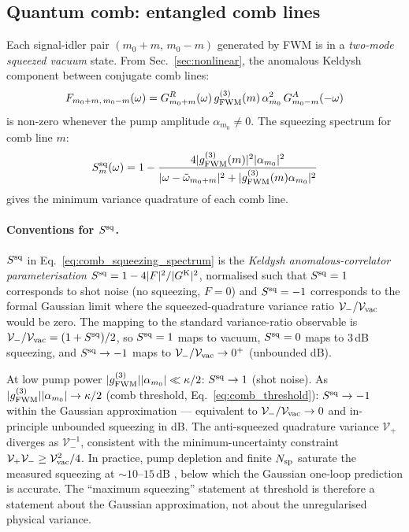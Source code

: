 \documentclass[12pt]{article}
\newcommand{\Keldysh}{{\rm K}}
\begin{document}
\subsection{Quantum comb: entangled comb lines}

Each signal-idler pair $(m_0+m,\, m_0-m)$ generated by FWM is in a
\emph{two-mode squeezed vacuum} state.  From Sec.~\ref{sec:nonlinear},
the anomalous Keldysh component between conjugate comb lines:
\begin{equation}
  F_{m_0+m,\,m_0-m}(\omega) =
  G^R_{m_0+m}(\omega)\,g^{(3)}_{\rm FWM}(m)\,\alpha_{m_0}^2\,
  G^A_{m_0-m}(-\omega)
  \label{eq:comb_squeezing}
\end{equation}
is non-zero whenever the pump amplitude $\alpha_{m_0}\neq 0$.  The
squeezing spectrum for comb line $m$:
\begin{equation}
  S^{\rm sq}_{m}(\omega) = 1 -
  \frac{4|g^{(3)}_{\rm FWM}(m)|^2|\alpha_{m_0}|^2}
  {|\omega - \tilde{\omega}_{m_0+m}|^2 + |g^{(3)}_{\rm FWM}(m)\alpha_{m_0}|^2}
  \label{eq:comb_squeezing_spectrum}
\end{equation}
gives the minimum variance quadrature of each comb line.
\paragraph{Conventions for $S^{\rm sq}$.}
$S^{\rm sq}$ in Eq.~\eqref{eq:comb_squeezing_spectrum} is the
\emph{Keldysh anomalous-correlator parameterisation}
$S^{\rm sq}=1-4|F|^2/|G^\Keldysh|^2$, normalised such that $S^{\rm sq}=1$
corresponds to shot noise (no squeezing, $F=0$) and $S^{\rm sq}=-1$
corresponds to the formal Gaussian limit where the squeezed-quadrature
variance ratio $\mathcal V_-/\mathcal V_{\rm vac}$ would be zero.  The
mapping to the standard variance-ratio observable is
$\mathcal V_-/\mathcal V_{\rm vac} = (1+S^{\rm sq})/2$, so $S^{\rm sq}=1$
maps to vacuum, $S^{\rm sq}=0$ maps to 3\,dB squeezing, and
$S^{\rm sq}\to -1$ maps to $\mathcal V_-/\mathcal V_{\rm vac}\to 0^+$
(unbounded dB).

At low pump power $|g^{(3)}_{\rm FWM}||\alpha_{m_0}|\ll\kappa/2$:
$S^{\rm sq}\to 1$ (shot noise).  As
$|g^{(3)}_{\rm FWM}||\alpha_{m_0}|\to\kappa/2$ (comb threshold,
Eq.~\ref{eq:comb_threshold}): $S^{\rm sq}\to -1$ within the Gaussian
approximation --- equivalent to $\mathcal V_-/\mathcal V_{\rm vac}\to 0$
and in-principle unbounded squeezing in dB.  The anti-squeezed
quadrature variance $\mathcal V_+$ diverges as $\mathcal V_-^{-1}$,
consistent with the minimum-uncertainty constraint $\mathcal V_+
\mathcal V_-\ge\mathcal V_{\rm vac}^2/4$.  In practice, pump depletion
and finite $N_{\rm sp}$ saturate the measured squeezing at
$\sim 10$--$15\,\mathrm{dB}$
\cite{Drummond1980,DrummondHillery2014}, below which the Gaussian
one-loop prediction is accurate.  The ``maximum squeezing''
statement at threshold is therefore a statement about the Gaussian
approximation, not about the unregularised physical variance.
\end{document}
